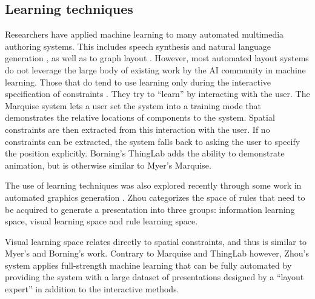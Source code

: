   \subsection{Learning techniques}
    \label{learning-techniques}

    Researchers have applied machine learning to many automated multimedia
    authoring systems. This includes speech synthesis \citep{pan-1} and natural
    language generation \citep{kamimura-1}, as well as to graph layout
    \citep{masui-1}. However, most automated layout systems do not leverage the
    large body of existing work by the AI community in machine learning. Those
    that do tend to use learning only during the interactive specification of
    constraints \citep{myers-1,borning-1}. They try to “learn” by interacting
    with the user. The Marquise system \citep{myers-1} lets a user set the
    system into a training mode that demonstrates the relative locations of
    components to the system. Spatial constraints are then extracted from this
    interaction with the user. If no constraints can be extracted, the system
    falls back to asking the user to specify the position explicitly. Borning’s
    \citep{borning-1} ThingLab adds the ability to demonstrate animation, but
    is otherwise similar to Myer's Marquise.

    The use
    of learning techniques
    was also explored recently through some work in automated graphics generation
    \citep{zhou-3}. Zhou categorizes the space of rules that
    need to be acquired to generate a presentation into three groups:
    information learning space, visual learning space and rule learning space.

    Visual learning space relates directly to spatial constraints, and thus
    is similar to Myer’s and Borning’s work. Contrary to Marquise and ThingLab
    however, Zhou’s system applies full-strength machine learning that can be
    fully automated by providing the system with a large dataset of
    presentations designed by a “layout expert” in addition to the interactive
    methods.

